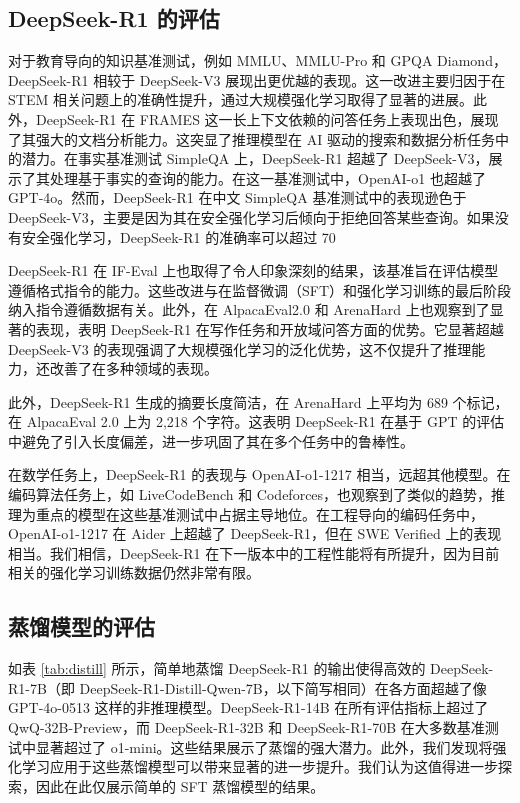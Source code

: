 \documentclass[lang=cn,a4paper,newtx]{elegantpaper}
\newcommand{\dsri}{DeepSeek-R1}
\begin{document}
\subsection{\dsri{} 的评估}


对于教育导向的知识基准测试，例如 MMLU、MMLU-Pro 和 GPQA Diamond，\dsri{} 相较于 DeepSeek-V3 展现出更优越的表现。这一改进主要归因于在 STEM 相关问题上的准确性提升，通过大规模强化学习取得了显著的进展。此外，\dsri{} 在 FRAMES 这一长上下文依赖的问答任务上表现出色，展现了其强大的文档分析能力。这突显了推理模型在 AI 驱动的搜索和数据分析任务中的潜力。在事实基准测试 SimpleQA 上，\dsri{} 超越了 DeepSeek-V3，展示了其处理基于事实的查询的能力。在这一基准测试中，OpenAI-o1 也超越了 GPT-4o。然而，\dsri{} 在中文 SimpleQA 基准测试中的表现逊色于 DeepSeek-V3，主要是因为其在安全强化学习后倾向于拒绝回答某些查询。如果没有安全强化学习，\dsri{} 的准确率可以超过 70%

\dsri{} 在 IF-Eval 上也取得了令人印象深刻的结果，该基准旨在评估模型遵循格式指令的能力。这些改进与在监督微调（SFT）和强化学习训练的最后阶段纳入指令遵循数据有关。此外，在 AlpacaEval2.0 和 ArenaHard 上也观察到了显著的表现，表明 \dsri{} 在写作任务和开放域问答方面的优势。它显著超越 DeepSeek-V3 的表现强调了大规模强化学习的泛化优势，这不仅提升了推理能力，还改善了在多种领域的表现。

此外，\dsri{} 生成的摘要长度简洁，在 ArenaHard 上平均为 689 个标记，在 AlpacaEval 2.0 上为 2,218 个字符。这表明 \dsri{} 在基于 GPT 的评估中避免了引入长度偏差，进一步巩固了其在多个任务中的鲁棒性。

在数学任务上，\dsri{} 的表现与 OpenAI-o1-1217 相当，远超其他模型。在编码算法任务上，如 LiveCodeBench 和 Codeforces，也观察到了类似的趋势，推理为重点的模型在这些基准测试中占据主导地位。在工程导向的编码任务中，OpenAI-o1-1217 在 Aider 上超越了 \dsri{}，但在 SWE Verified 上的表现相当。我们相信，\dsri{} 在下一版本中的工程性能将有所提升，因为目前相关的强化学习训练数据仍然非常有限。

\subsection{蒸馏模型的评估}
\label{sec:distilled_model_evaluation}


如表 \ref{tab:distill} 所示，简单地蒸馏 DeepSeek-R1 的输出使得高效的 DeepSeek-R1-7B（即 DeepSeek-R1-Distill-Qwen-7B，以下简写相同）在各方面超越了像 GPT-4o-0513 这样的非推理模型。DeepSeek-R1-14B 在所有评估指标上超过了 QwQ-32B-Preview，而 DeepSeek-R1-32B 和 DeepSeek-R1-70B 在大多数基准测试中显著超过了 o1-mini。这些结果展示了蒸馏的强大潜力。此外，我们发现将强化学习应用于这些蒸馏模型可以带来显著的进一步提升。我们认为这值得进一步探索，因此在此仅展示简单的 SFT 蒸馏模型的结果。
\end{document}
